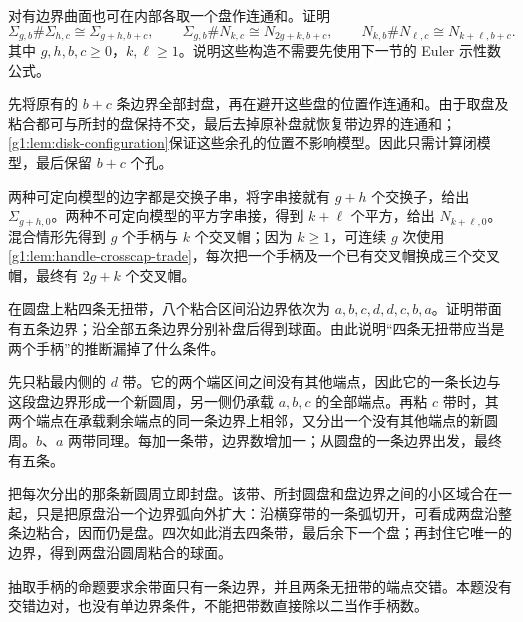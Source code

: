 \begin{exercise}
	对有边界曲面也可在内部各取一个盘作连通和。证明
	\[
		\Sigma_{g,b}\#\Sigma_{h,c}\cong\Sigma_{g+h,b+c},\qquad
		\Sigma_{g,b}\#N_{k,c}\cong N_{2g+k,b+c},\qquad
		N_{k,b}\#N_{\ell,c}\cong N_{k+\ell,b+c}.
	\]
	其中 \(g,h,b,c\ge0\)，\(k,\ell\ge1\)。说明这些构造不需要先使用下一节的 Euler 示性数公式。
\end{exercise}
\begin{solution}
	先将原有的 \(b+c\) 条边界全部封盘，再在避开这些盘的位置作连通和。由于取盘及粘合都可与所封的盘保持不交，最后去掉原补盘就恢复带边界的连通和；\cref{g1:lem:disk-configuration}保证这些余孔的位置不影响模型。因此只需计算闭模型，最后保留 \(b+c\) 个孔。

	两种可定向模型的边字都是交换子串，将字串接就有 \(g+h\) 个交换子，给出 \(\Sigma_{g+h,0}\)。两种不可定向模型的平方字串接，得到 \(k+\ell\) 个平方，给出 \(N_{k+\ell,0}\)。混合情形先得到 \(g\) 个手柄与 \(k\) 个交叉帽；因为 \(k\ge1\)，可连续 \(g\) 次使用\cref{g1:lem:handle-crosscap-trade}，每次把一个手柄及一个已有交叉帽换成三个交叉帽，最终有 \(2g+k\) 个交叉帽。
\end{solution}

\begin{exercise}
	在圆盘上粘四条无扭带，八个粘合区间沿边界依次为 \(a,b,c,d,d,c,b,a\)。证明带面有五条边界；沿全部五条边界分别补盘后得到球面。由此说明“四条无扭带应当是两个手柄”的推断漏掉了什么条件。
\end{exercise}
\begin{solution}
	先只粘最内侧的 \(d\) 带。它的两个端区间之间没有其他端点，因此它的一条长边与这段盘边界形成一个新圆周，另一侧仍承载 \(a,b,c\) 的全部端点。再粘 \(c\) 带时，其两个端点在承载剩余端点的同一条边界上相邻，又分出一个没有其他端点的新圆周。\(b\)、\(a\) 两带同理。每加一条带，边界数增加一；从圆盘的一条边界出发，最终有五条。

	把每次分出的那条新圆周立即封盘。该带、所封圆盘和盘边界之间的小区域合在一起，只是把原盘沿一个边界弧向外扩大：沿横穿带的一条弧切开，可看成两盘沿整条边粘合，因而仍是盘。四次如此消去四条带，最后余下一个盘；再封住它唯一的边界，得到两盘沿圆周粘合的球面。

	抽取手柄的命题要求余带面只有一条边界，并且两条无扭带的端点交错。本题没有交错边对，也没有单边界条件，不能把带数直接除以二当作手柄数。
\end{solution}

